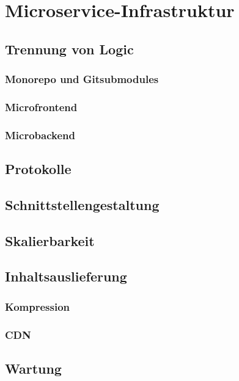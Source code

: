 \chapter{Microservice-Infrastruktur}

\section{Trennung von Logic}
\subsection{Monorepo und Gitsubmodules}

\subsection{Microfrontend}

\subsection{Microbackend}

\section{Protokolle}

\section{Schnittstellengestaltung}

\section{Skalierbarkeit}

\section{Inhaltsauslieferung}

\subsection{Kompression}
\subsection{CDN}

\section{Wartung}
